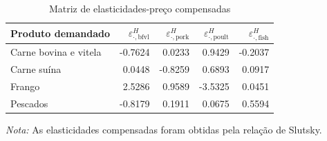 
\begin{table}[H]
\centering
\caption{Matriz de elasticidades-preço compensadas}
\label{tab:elasticidades-compensadas-dup}
\small
\begin{tabular}{@{}lrrrr@{}}
\toprule
Produto demandado & $\varepsilon^H_{\cdot,\text{bfvl}}$ & $\varepsilon^H_{\cdot,\text{pork}}$ & $\varepsilon^H_{\cdot,\text{poult}}$ & $\varepsilon^H_{\cdot,\text{fish}}$ \\
\midrule
Carne bovina e vitela & -0.7624 & 0.0233 & 0.9429 & -0.2037 \\
Carne suína & 0.0448 & -0.8259 & 0.6893 & 0.0917 \\
Frango & 2.5286 & 0.9589 & -3.5325 & 0.0451 \\
Pescados & -0.8179 & 0.1911 & 0.0675 & 0.5594 \\
\bottomrule
\end{tabular}
\par\vspace{0.35em}
\begin{minipage}{0.92\textwidth}\footnotesize \textit{Nota:} As elasticidades compensadas foram obtidas pela relação de Slutsky.\end{minipage}
\end{table}
